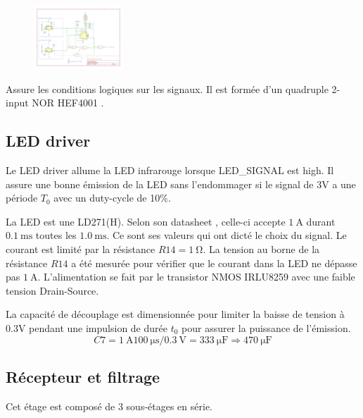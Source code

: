 \documentclass[french]{layout/Report}
\begin{document}
\begin{description}[leftmargin=!,labelwidth=3cm, labelindent=\parindent]
        \begin{figure}[H]
        \centering
        \includegraphics[width=0.3\textwidth]{fig/burst_timer.pdf}
        \end{figure}

	\item[Logic] Assure les conditions logiques sur les signaux. Il est formée d'un quadruple 2-input NOR HEF4001 \cite{HEF4001B}.
\end{description}

\subsection{LED driver}
\label{subsec:LED_driver}
Le LED driver allume la LED infrarouge lorsque LED\_SIGNAL est high. Il assure une bonne émission de la LED sans l'endommager si le signal de 3V a une période $T_0$ avec un duty-cycle de 10\%.

La LED est une LD271(H). Selon son datasheet \cite{LD271(H)}, celle-ci accepte $\SI{1}{\ampere}$ durant $\SI{0.1}{\milli\second}$ toutes les $\SI{1.0}{\milli\second}$. Ce sont ses valeurs qui ont dicté le choix du signal. Le courant est limité par la résistance $\mathit{R14} = \SI{1}{\ohm}$. 
La tension au borne de la résistance $\mathit{R14}$ a été mesurée pour vérifier que le courant dans la LED ne dépasse pas $\SI{1}{\ampere}$.
L'alimentation se fait par le transistor NMOS IRLU8259\cite{IRLU8259} avec une faible tension Drain-Source.

La capacité de découplage est dimensionnée pour limiter la baisse de tension à 0.3V pendant une impulsion de durée $t_0$ pour assurer la puissance de l'émission.
\begin{equation*}
	\mathit{C7} = \SI{1}{\ampere}\SI{100}{\micro\second}/\SI{0.3}{\volt} = \SI{333}{\micro\farad} \Rightarrow \SI{470}{\micro\farad}
\end{equation*}


\subsection{Récepteur et filtrage}
Cet étage est composé de 3 sous-étages en série.
\end{document}
